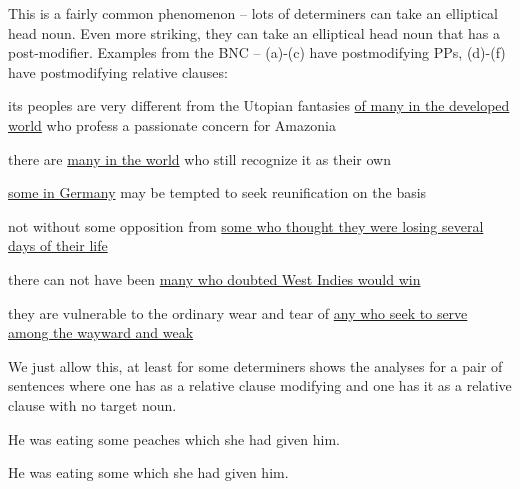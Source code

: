 \documentclass[11pt,a4paper]{article}
\begin{document}
This is a fairly common phenomenon -- lots of determiners can take an
elliptical head noun. Even more striking, they can take an elliptical
head noun that has a post-modifier. Examples from the BNC -- (a)-(c)
have postmodifying PPs, (d)-(f) have postmodifying relative clauses:

\begin{examples}
\item\label{ZERONOUNS}
\begin{examples}
\item its peoples are very different from the Utopian fantasies \uline{of many in the developed world} who profess a passionate concern for Amazonia 
\item there are \uline{many in the world} who still recognize it as their own
\item \uline{some in Germany} may be tempted to seek reunification on
  the basis
\item not without some opposition from \uline{some who thought they
    were losing several days of their life}
\item there can not have been \uline{many who doubted West Indies
    would win}
\item they are vulnerable to the ordinary wear and tear of \uline{any who seek to serve among the wayward and weak}
\end{examples}
\end{examples}

We just allow this, at least for some determiners 
shows the analyses for a pair of sentences where one has  as a relative clause modifying  and one
has it as a relative clause with no target noun.

\begin{examples}
\item \label{RCLAUSES}
\begin{examples}
\item He was eating some peaches which she had given him. 
\item He was eating some which she had given him.
\end{examples}
\end{examples}
\end{document}
